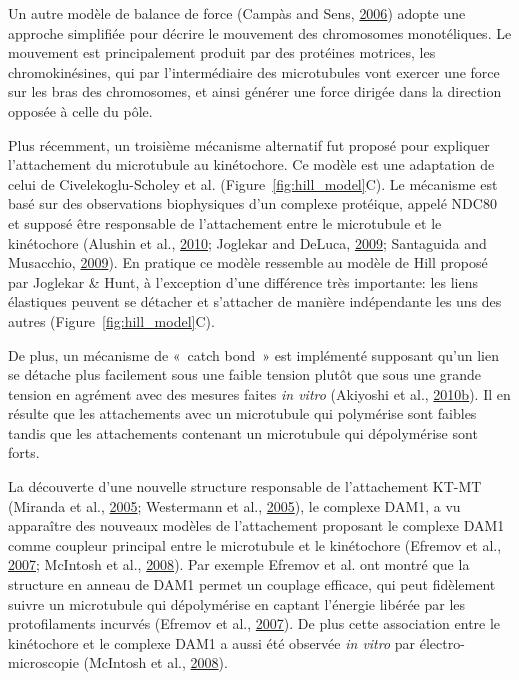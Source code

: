\documentclass[12pt,a4paper,twoside,openright]{book}
\begin{document}
Un autre modèle de balance de force (Campàs and Sens,
\protect\hyperlink{ref-Campas2006}{2006}) adopte une approche simplifiée
pour décrire le mouvement des chromosomes monotéliques. Le mouvement est
principalement produit par des protéines motrices, les chromokinésines,
qui par l'intermédiaire des microtubules vont exercer une force sur les
bras des chromosomes, et ainsi générer une force dirigée dans la
direction opposée à celle du pôle.

Plus récemment, un troisième mécanisme alternatif fut proposé pour
expliquer l'attachement du microtubule au kinétochore. Ce modèle est une
adaptation de celui de Civelekoglu-Scholey et al.
(Figure~\ref{fig:hill_model}C). Le mécanisme est basé sur des
observations biophysiques d'un complexe protéique, appelé NDC80 et
supposé être responsable de l'attachement entre le microtubule et le
kinétochore (Alushin et al., \protect\hyperlink{ref-Alushin2010}{2010};
Joglekar and DeLuca, \protect\hyperlink{ref-Joglekar2009}{2009};
Santaguida and Musacchio,
\protect\hyperlink{ref-Santaguida2009a}{2009}). En pratique ce modèle
ressemble au modèle de Hill proposé par Joglekar \& Hunt, à l'exception
d'une différence très importante: les liens élastiques peuvent se
détacher et s'attacher de manière indépendante les uns des autres
(Figure~\ref{fig:hill_model}C).

De plus, un mécanisme de «~catch bond~» est implémenté supposant qu'un
lien se détache plus facilement sous une faible tension plutôt que sous
une grande tension en agrément avec des mesures faites \emph{in vitro}
(Akiyoshi et al.,
\protect\hyperlink{ref-Akiyoshi2010}{2010}\protect\hyperlink{ref-Akiyoshi2010}{b}).
Il en résulte que les attachements avec un microtubule qui polymérise
sont faibles tandis que les attachements contenant un microtubule qui
dépolymérise sont forts.

La découverte d'une nouvelle structure responsable de l'attachement
KT-MT (Miranda et al., \protect\hyperlink{ref-Miranda2005}{2005};
Westermann et al., \protect\hyperlink{ref-Westermann2005}{2005}), le
complexe DAM1, a vu apparaître des nouveaux modèles de l'attachement
proposant le complexe DAM1 comme coupleur principal entre le microtubule
et le kinétochore (Efremov et al.,
\protect\hyperlink{ref-Efremov2007}{2007}; McIntosh et al.,
\protect\hyperlink{ref-McIntosh2008}{2008}). Par exemple Efremov et al.
ont montré que la structure en anneau de DAM1 permet un couplage
efficace, qui peut fidèlement suivre un microtubule qui dépolymérise en
captant l'énergie libérée par les protofilaments incurvés (Efremov et
al., \protect\hyperlink{ref-Efremov2007}{2007}). De plus cette
association entre le kinétochore et le complexe DAM1 a aussi été
observée \emph{in vitro} par électro-microscopie (McIntosh et al.,
\protect\hyperlink{ref-McIntosh2008}{2008}).
\end{document}
